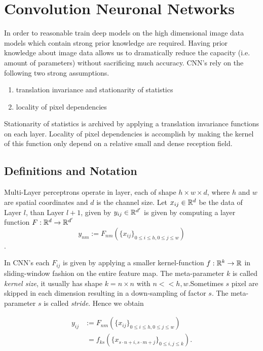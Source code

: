 \section{Convolution Neuronal Networks}\label{sec:cnn}

In order to reasonable train deep models on the high dimensional image data models which contain strong prior knowledge are required. Having prior knowledge about image data allows us to dramatically reduce the capacity (i.e. amount of parameters) without sacrificing much accuracy. CNN's rely on the following two strong assumptions.

\begin{enumerate}
    \item translation invariance and stationarity of statistics
	\item locality of pixel dependencies
\end{enumerate}

Stationarity of statistics is archived by applying a translation invariance functions on each layer. Locality of pixel dependencies is accomplish by making the kernel of this function only depend on a relative small and dense reception field. 

\subsection{Definitions and Notation} \label{sec:cnn_not}

Multi-Layer perceptrons operate in layer, each of shape $h \times w \times d$, where $h$ and $w$ are spatial coordinates and $d$ is the channel size. Let $x_{ij} \in \mathbb{R}^d$ be the data of Layer $l$, than Layer $l+1$, given by $y_{ij} \in \mathbb{R}^{d'}$ is given by computing a layer function $F: \mathbb{R}^d \rightarrow \mathbb{R}^{d'}$
\begin{equation*}
y_{nm} := F_{nm} (\{ x_{ij} \}_{0 \leq i \leq h, 0 \leq j \leq w}   )
\end{equation*}.

In CNN's each $F_{ij}$ is given by applying a smaller kernel-function $f: \mathbb{R}^k \rightarrow \mathbb{R}$ in sliding-window fashion on the entire feature map. The meta-parameter $k$ is called \emph{kernel size}, it usually has shape $k = n \times n$ with $n << h,w$.Sometimes $s$ pixel are skipped in each dimension resulting in a down-sampling of factor $s$. The meta-parameter $s$ is called \emph{stride}. Hence we obtain

\begin{align*}
y_{ij} &:= F_{nm} (\{ x_{ij} \}_{0 \leq i \leq h, 0 \leq j \leq w}   ) \\&\; = f_{ks} (\{x_{s \cdot n + i, s \cdot m + j}  \}_{0 \leq i,j \leq k} ).
\end{align*}

